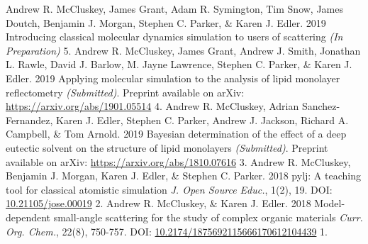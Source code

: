 \begin{cvpubys}
  \cvpuby
    {Andrew R. McCluskey, James Grant, Adam R. Symington, Tim Snow, James Doutch, Benjamin J. Morgan, Stephen C. Parker, \& Karen J. Edler.}
    {2019}
    {Introducing classical molecular dynamics simulation to users of scattering}
    {\emph{(In Preparation)}}
    {5.}
  \cvpuby
    {Andrew R. McCluskey, James Grant, Andrew J. Smith, Jonathan L. Rawle, David J. Barlow, M. Jayne Lawrence, Stephen C. Parker, \& Karen J. Edler.}
    {2019}
    {Applying molecular simulation to the analysis of lipid monolayer reflectometry}
    {\emph{(Submitted)}. Preprint available on arXiv: \href{1901.05514}{https://arxiv.org/abs/1901.05514}}
    {4.}
  \cvpuby
    {Andrew R. McCluskey, Adrian Sanchez-Fernandez, Karen J. Edler, Stephen C. Parker, Andrew J. Jackson, Richard A. Campbell, \& Tom Arnold.}
    {2019}
    {Bayesian determination of the effect of a deep eutectic solvent on the structure of lipid monolayers}
    {\emph{(Submitted)}. Preprint available on arXiv: \href{1810.07616}{https://arxiv.org/abs/1810.07616}}
    {3.}
  \cvpuby
    {Andrew R. McCluskey, Benjamin J. Morgan, Karen J. Edler, \& Stephen C. Parker.}
    {2018}
    {pylj: A teaching tool for classical atomistic simulation}
    {\emph{J. Open Source Educ.}, 1(2), 19. DOI: \href{http://doi.org/10.21105/jose.00019}{10.21105/jose.00019}}
    {2.}
  \cvpuby
    {Andrew R. McCluskey, \& Karen J. Edler.}
    {2018}
    {Model-dependent small-angle scattering for the study of complex organic materials}
    {\emph{Curr. Org. Chem.}, 22(8), 750-757. DOI: \href{http://doi.org/10.2174/1875692115666170612104439}{10.2174/1875692115666170612104439}}
    {1.}
\end{cvpubys}
